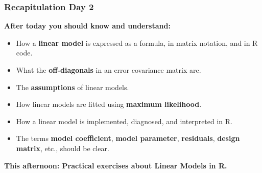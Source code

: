 \documentclass{beamer}
\newenvironment{VerbatimIN}
 {\VerbatimEnvironment
  \begin{tcolorbox}[
    breakable,
    colback=lightgray,
    spartan
  ]%
  \begin{Verbatim}}
 {\end{Verbatim}\end{tcolorbox}}
\begin{document}
\begin{frame}[fragile]
\begin{columns}
    \end{columns}
    
\end{frame}

\begin{frame}
    \frametitle{Recapitulation Day 2}
    \textbf{After today you should know and understand:}
    \begin{itemize}
        \item How a \textbf{linear model} is expressed as a formula, in matrix notation, and in R code.
        \item What the \textbf{off-diagonals} in an error covariance matrix are.
        \item The \textbf{assumptions} of linear models.
        \item How linear models are fitted using \textbf{maximum likelihood}.
        \item How a linear model is implemented, diagnosed, and interpreted in R.
        \item The terms \textbf{model coefficient}, \textbf{model parameter}, \textbf{residuals}, \textbf{design matrix}, etc., should be clear.
    \end{itemize}
    \vspace{1cm}
    \textbf{This afternoon: Practical exercises about Linear Models in R.}
\end{frame}
\end{document}

